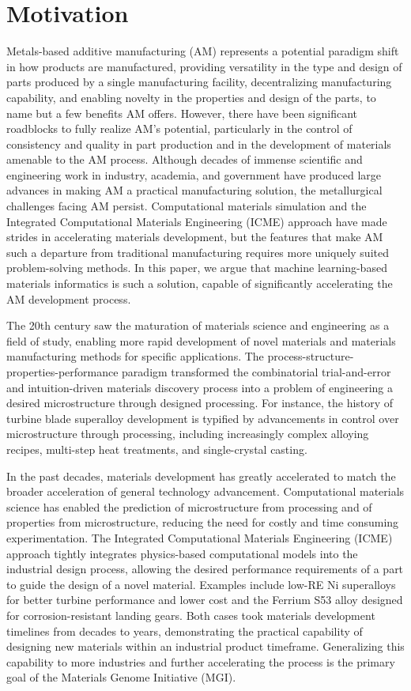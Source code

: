 \section{Motivation}

Metals-based additive manufacturing (AM) represents a potential paradigm shift in how products are manufactured, providing versatility in the type and design of parts produced by a single manufacturing facility, decentralizing manufacturing capability, and enabling novelty in the properties and design of the parts, to name but a few benefits AM offers. However, there have been significant roadblocks to fully realize AM's potential, particularly in the control of consistency and quality in part production and in the development of materials amenable to the AM process. Although decades of immense scientific and engineering work in industry, academia, and government have produced large advances in making AM a practical manufacturing solution, the metallurgical challenges facing AM persist. Computational materials simulation and the Integrated Computational Materials Engineering (ICME) approach have made strides in accelerating materials development, but the features that make AM such a departure from traditional manufacturing requires more uniquely suited problem-solving methods. In this paper, we argue that machine learning-based materials informatics is such a solution, capable of significantly accelerating the AM development process.


The 20th century saw the maturation of materials science and engineering as a field of study, enabling more rapid development of novel materials and materials manufacturing methods for specific applications. The process-structure-properties-performance paradigm transformed the combinatorial trial-and-error and intuition-driven materials discovery process into a problem of engineering a desired microstructure through designed processing. For instance, the history of turbine blade superalloy development is typified by advancements in control over microstructure through processing, including increasingly complex alloying recipes, multi-step heat treatments, and single-crystal casting. 

In the past decades, materials development has greatly accelerated to match the broader acceleration of general technology advancement. Computational materials science has enabled the prediction of microstructure from processing and of properties from microstructure, reducing the need for costly and time consuming experimentation. The Integrated Computational Materials Engineering (ICME) approach tightly integrates physics-based computational models into the industrial design process, allowing the desired performance requirements of a part to guide the design of a novel material. Examples include low-RE Ni superalloys for better turbine performance and lower cost and the Ferrium S53 alloy designed for corrosion-resistant landing gears. Both cases took materials development timelines from decades to years, demonstrating the practical capability of designing new materials within an industrial product timeframe. Generalizing this capability to more industries and further accelerating the process is the primary goal of the Materials Genome Initiative (MGI). 

